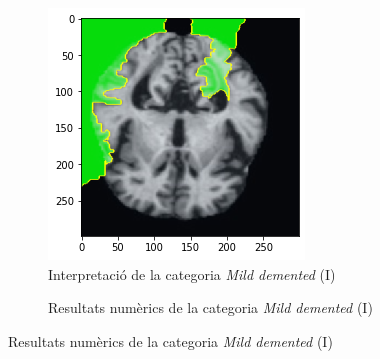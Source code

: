 \documentclass[a4paper,12pt]{report}
\begin{document}
\begin{figure}[h!]
    \centering
    \begin{subfigure}[b]{0.40\linewidth}
        \includegraphics[width=\linewidth]{images/Mild.png}
        \caption{Interpretació de la categoria \textit{Mild demented} (I)}
        \label{fig:MD1}
    \end{subfigure}
    \begin{subfigure}[b]{0.40\linewidth}
        \caption{Resultats numèrics de la categoria \textit{Mild demented} (I)}
        \label{fig:ClassificacioMD1}

\end{subfigure}
\end{figure}
\end{document}
